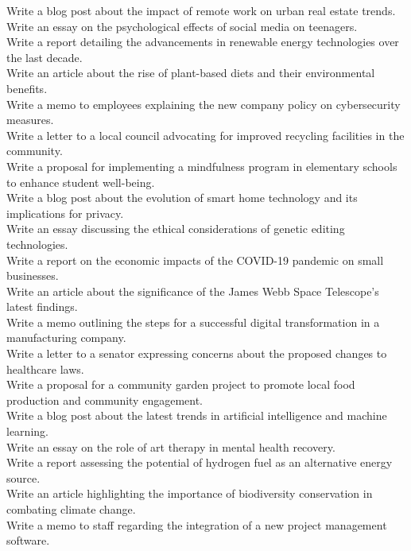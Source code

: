 \begin{examplebox}
\small
Write a blog post about the impact of remote work on urban real estate trends. \\
Write an essay on the psychological effects of social media on teenagers. \\
Write a report detailing the advancements in renewable energy technologies over the last decade. \\
Write an article about the rise of plant-based diets and their environmental benefits. \\
Write a memo to employees explaining the new company policy on cybersecurity measures. \\
Write a letter to a local council advocating for improved recycling facilities in the community. \\
Write a proposal for implementing a mindfulness program in elementary schools to enhance student well-being. \\
Write a blog post about the evolution of smart home technology and its implications for privacy. \\
Write an essay discussing the ethical considerations of genetic editing technologies. \\
Write a report on the economic impacts of the COVID-19 pandemic on small businesses. \\
Write an article about the significance of the James Webb Space Telescope's latest findings. \\
Write a memo outlining the steps for a successful digital transformation in a manufacturing company. \\
Write a letter to a senator expressing concerns about the proposed changes to healthcare laws. \\
Write a proposal for a community garden project to promote local food production and community engagement. \\
Write a blog post about the latest trends in artificial intelligence and machine learning. \\
Write an essay on the role of art therapy in mental health recovery. \\
Write a report assessing the potential of hydrogen fuel as an alternative energy source. \\
Write an article highlighting the importance of biodiversity conservation in combating climate change. \\
Write a memo to staff regarding the integration of a new project management software. \\

\end{examplebox}
